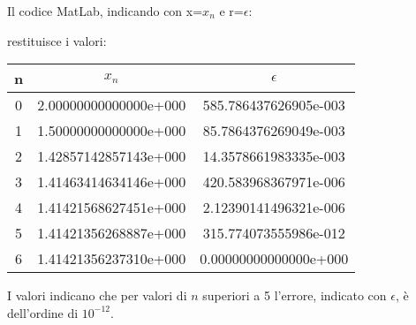 \begin{flushleft}
Il codice MatLab, indicando con x=$x_n$ e r=$\epsilon$:

restituisce i valori:
\begin{center}
\begin{tabular}{c|c|c}
n & $x_n$ & $\epsilon$ \\
\hline
    0 & 2.00000000000000e+000 & 585.786437626905e-003\\
    1 & 1.50000000000000e+000 & 85.7864376269049e-003\\
    2 & 1.42857142857143e+000 & 14.3578661983335e-003\\
    3 & 1.41463414634146e+000 & 420.583968367971e-006\\
    4 & 1.41421568627451e+000 & 2.12390141496321e-006\\
    5 & 1.41421356268887e+000 & 315.774073555986e-012\\
    6 & 1.41421356237310e+000 & 0.00000000000000e+000\\
\end{tabular}
\end{center}
I valori indicano che per valori di $n$ superiori a 5 l'errore, indicato con $\epsilon$, è dell'ordine di \(10^{-12}\).
\end{flushleft}